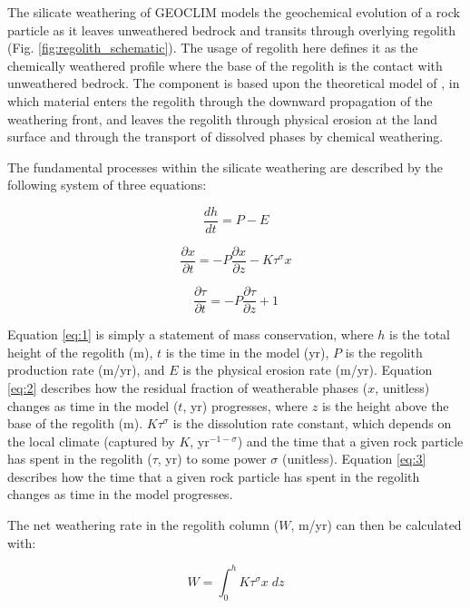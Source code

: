 \documentclass[11pt,letterpaper]{article}
\begin{document}
The silicate weathering of GEOCLIM models the geochemical evolution of a rock particle as it leaves unweathered bedrock and transits through overlying regolith (Fig. \ref{fig:regolith_schematic}). The usage of regolith here defines it as the chemically weathered profile where the base of the regolith is the contact with unweathered bedrock. The component is based upon the theoretical model of \citet{Gabet2009a}, in which material enters the regolith through the downward propagation of the weathering front, and leaves the regolith through physical erosion at the land surface and through the transport of dissolved phases by chemical weathering.

The fundamental processes within the silicate weathering are described by the following system of three equations:

\begin{equation}
    \frac{dh}{dt} = P - E
    \label{eq:1}
\end{equation}

\begin{equation}
    \frac{\partial x}{\partial t} = -P \frac{\partial x}{\partial z} - K \tau^{\sigma}x
    \label{eq:2}
\end{equation}

\begin{equation}
    \frac{\partial \tau}{\partial t} = -P \frac{\partial \tau}{\partial z} + 1
    \label{eq:3}
\end{equation}

\noindent
Equation \ref{eq:1} is simply a statement of mass conservation, where $h$ is the total height of the regolith (m), $t$ is the time in the model (yr), $P$ is the regolith production rate (m/yr), and $E$ is the physical erosion rate (m/yr). Equation \ref{eq:2} describes how the residual fraction of weatherable phases ($x$, unitless) changes as time in the model ($t$, yr) progresses, where $z$ is the height above the base of the regolith (m). $K \tau^{\sigma}$ is the dissolution rate constant, which depends on the local climate (captured by $K$, yr$^{-1-\sigma}$) and the time that a given rock particle has spent in the regolith ($\tau$, yr) to some power $\sigma$ (unitless). Equation \ref{eq:3} describes how the time that a given rock particle has spent in the regolith changes as time in the model progresses.

The net weathering rate in the regolith column ($W$, m/yr) can then be calculated with:

\begin{equation}
    W = \int_{0}^{h} K \tau^{\sigma} x\;dz
    \label{eq:4}
\end{equation}
\end{document}
